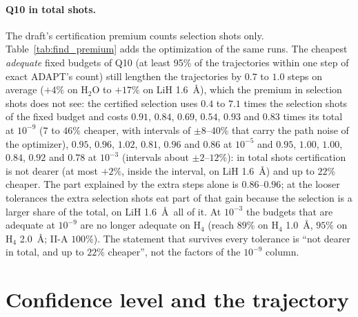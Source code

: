 \documentclass[11pt]{article}
\begin{document}
\paragraph{Q10 in total shots.} The draft's certification premium counts selection shots only. Table~\ref{tab:find_premium} adds the optimization of the same runs. The cheapest \emph{adequate} fixed budgets of Q10 (at least 95\% of the trajectories within one step of exact ADAPT's count)
still lengthen the trajectories by $0.7$ to $1.0$ steps on average ($+4\%$ on H$_2$O to $+17\%$ on LiH 1.6~\AA), which the premium in selection shots does not see: the certified selection uses $0.4$ to $7.1$ times the selection shots of the fixed budget and costs $0.91$, $0.84$, $0.69$, $0.54$, $0.93$ and $0.83$ times its total at $10^{-9}$ ($7$ to $46\%$ cheaper, with intervals of $\pm8$--$40\%$ that carry the path noise of the optimizer),
$0.95$, $0.96$, $1.02$, $0.81$, $0.96$ and $0.86$ at $10^{-5}$ and $0.95$, $1.00$, $1.00$, $0.84$, $0.92$ and $0.78$ at $10^{-3}$ (intervals about $\pm2$--$12\%$): in total shots certification is not dearer (at most $+2\%$, inside the interval, on LiH 1.6~\AA) and up to $22\%$ cheaper. The part explained by the extra steps alone is $0.86$--$0.96$; at the looser tolerances the extra selection shots eat part of that gain because the selection is a larger share of the total, on LiH 1.6~\AA\ all of it.
At $10^{-3}$ the budgets that are adequate at $10^{-9}$ are no longer adequate on H$_4$ (reach $89\%$ on H$_4$ 1.0~\AA, $95\%$ on H$_4$ 2.0~\AA; II-A $100\%$). The statement that survives every tolerance is ``not dearer in total, and up to $22\%$ cheaper'', not the factors of the $10^{-9}$ column.

\section{Confidence level and the trajectory}\label{sec:conf}
\end{document}
